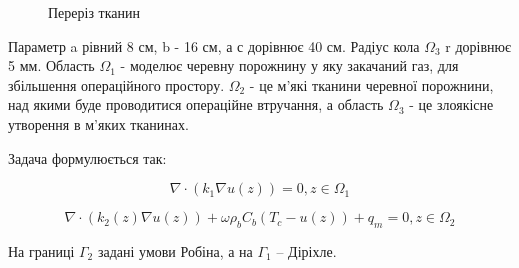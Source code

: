 \begin{figure}[ht!]
    \centering
    
    \caption{Переріз тканин}
    \label{fig:thermo_2d_domain}
\end{figure}

\noindent Параметр a рівний 8 см, b - 16 см, а с дорівнює 40 см. Радіус кола $\Omega_3$ r дорівнює 5 мм. Область 
$\Omega_1$ - моделює черевну порожнину у яку закачаний газ, для збільшення операційного простору. $\Omega_2$ - це 
м'які тканини черевної порожнини, над якими буде проводитися операційне втручання, а область $\Omega_3$ - це злоякісне
утворення в м'яких тканинах.

\noindent Задача формулюється так:

\begin{equation}
    \label{eqn:thermo_2d_eqn_co2}
    \nabla \cdot (k_1 \nabla u(z)) = 0, z \in \Omega_1
\end{equation}

\begin{equation}
    \label{eqn:thermo_2d_eqn_tissue}
    \nabla \cdot (k_2(z) \nabla u(z)) + \omega \rho_b C_b (T_c - u(z)) + q_m  = 0, z \in \Omega_2
\end{equation}

\noindent На границі $\Gamma_2$ задані умови Робіна, а на $\Gamma_1$ -- Діріхле.

